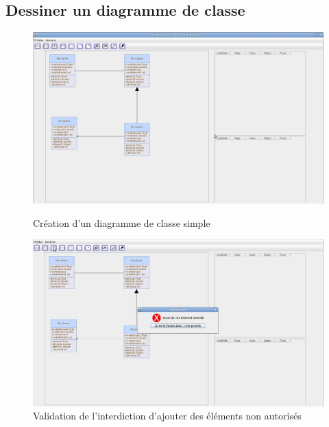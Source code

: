 \documentclass[12pt,a4paper,openany]{report}
\begin{document}
		\subsection{Dessiner un diagramme de classe}
		\begin{figure}[H]
			\centering
			\includegraphics[width=18cm]{validation1.jpg}
			\caption{Création d'un diagramme de classe simple}
			\includegraphics[width=18cm]{validation2.jpg}
			\caption{Validation de l'interdiction d'ajouter des éléments non autorisés}
		\end{figure}
\end{document}
